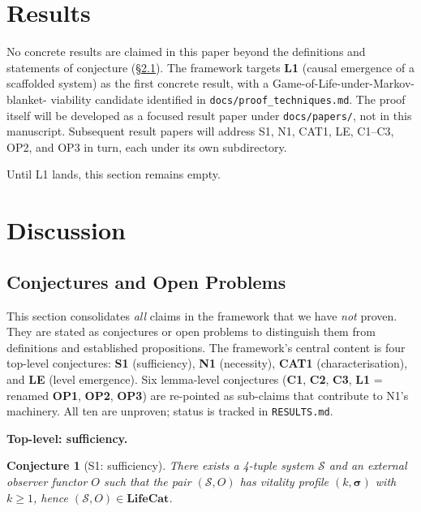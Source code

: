 \documentclass[journal]{IEEEtran}
\theoremstyle{plain}
\theoremstyle{definition}
\theoremstyle{plain}
\newtheorem*{conjecturestar}{Conjecture}
\newenvironment{namedconjecture}[1]{%
  \begin{conjecturestar}[#1]%
}{\end{conjecturestar}}
\newcounter{topic}[subsection]
\newcommand{\topic}[1]{%
  \refstepcounter{topic}%
  \par\smallskip\noindent\textbf{#1.}\ }
\begin{document}
\section{Results}\label{sec:results}

No concrete results are claimed in this paper beyond the definitions
and statements of conjecture (\S\ref{sec:conjectures}). The framework
targets \textbf{L1} (causal emergence of a scaffolded system) as the
first concrete result, with a Game-of-Life-under-Markov-blanket-
viability candidate identified in \texttt{docs/proof\_techniques.md}.
The proof itself will be developed as a focused result paper under
\texttt{docs/papers/}, not in this manuscript. Subsequent result
papers will address S1, N1, CAT1, LE, C1--C3, OP2, and OP3 in turn,
each under its own subdirectory.

Until L1 lands, this section remains empty.

\section{Discussion}\label{sec:discussion}

\subsection{Conjectures and Open Problems}\label{sec:conjectures}

This section consolidates \emph{all} claims in the framework that we
have \emph{not} proven. They are stated as conjectures or open
problems to distinguish them from definitions and established
propositions. The framework's central content is four top-level
conjectures: \textbf{S1} (sufficiency), \textbf{N1} (necessity),
\textbf{CAT1} (characterisation), and \textbf{LE} (level emergence).
Six lemma-level conjectures (\textbf{C1}, \textbf{C2}, \textbf{C3},
\textbf{L1} = renamed \textbf{OP1}, \textbf{OP2}, \textbf{OP3}) are
re-pointed as sub-claims that contribute to N1's machinery. All ten
are unproven; status is tracked in \texttt{RESULTS.md}.

\topic{Top-level: sufficiency}\label{sec:s1}

\begin{namedconjecture}{S1: sufficiency}
There exists a 4-tuple system $\mathcal{S}$ and an external observer
functor $O$ such that the pair $(\mathcal{S}, O)$ has vitality profile
$(k, \boldsymbol{\sigma})$ with $k \geq 1$, hence $(\mathcal{S}, O) \in
\mathbf{LifeCat}$.
\end{namedconjecture}
\end{document}
